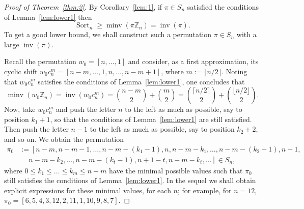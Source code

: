 \documentclass[11pt]{amsart}
\numberwithin{equation}{section}
\newcommand{\todo}[1]{\vspace{5 mm}\par \noindent
\marginpar{\textsc{ToDo}} \framebox{\begin{minipage}[c]{0.95
\textwidth}
 #1 \end{minipage}}\vspace{5 mm}\par}
\newcommand{\ZZ}{{\mathbb {Z}}}
\newcommand{\inv}{{\operatorname{inv}}}
\newcommand{\minv}{{\operatorname{minv}}}
\newcommand{\Sort}{{\operatorname{Sort}}}
\begin{document}
\begin{proof}[Proof of Theorem~\ref{thm:2}]
    By Corollary~\ref{lem:1}, if $\pi \in S_n$ satisfied the conditions of Lemma~\ref{lem:lower1} then
    \[
        \Sort_n
        \ge \minv(\pi \ZZ_n) 
        = \inv(\pi).
    \]
To get a good lower bound, 
we shall construct such a permutation $\pi\in S_n$ with a large  $\inv(\pi)$.


Recall the permutation $w_0 = [n,\ldots,1]$ and consider, as a first approximation, its cyclic shift $w_0 c_n^{m} =[n-m,\ldots,1,n,\ldots,n-m+1]$, where $m:=\lfloor n/2\rfloor$.  
Noting that $w_0 c_n^{m}$ satisfies the conditions of Lemma~\ref{lem:lower1}, one concludes that
\[
    \minv(w_0\ZZ_n)
    = \inv(w_0 c_n^{m})
    = \binom{n-m}{2}+\binom{m}{2}=\binom{\lceil n/2\rceil}{2}+\binom{\lfloor n/2 \rfloor}{2}.
\]
Now, take $w_0 c_n^{m}$ and push the letter $n$ to the left %
as much as possible, say to position $k_1 + 1$, so that the conditions of Lemma~\ref{lem:lower1} are still satisfied.
Then push the letter $n-1$ to the left as much as possible, say to position $k_2 + 2$, and so on. We obtain the permutation
\begin{align}\label{eq:defpi}
    \pi_0
    &:= \left[
    n-m,n-m-1,\dots, n-m-(k_1-1),n,n-m-k_1,\dots, n-m-(k_2-1),n-1, \right. \\
    & \quad\; \left. n-m-k_2,\dots, 
    n-m-(k_t-1),n+1-t,n-m-k_t,\dots \right] \in S_n, \nonumber
\end{align}
where $0 \le k_1 \le \ldots \le k_{m} \le n-m$ have the minimal possible values such that $\pi_0$ still satisfies the conditions of Lemma~\ref{lem:lower1}. In the sequel we shall obtain explicit expressions for these minimal values, for each $n$; 
for example, for $n=12$, $\pi_0 =[6,5,4,3,12,2,11,1,10,9,8,7]$. 


\end{proof}
\end{document}
